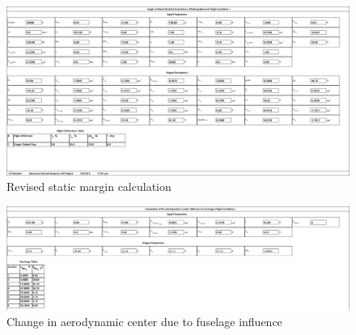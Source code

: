 \documentclass[conf]{new-aiaa}
\begin{document}
\begin{figure}[H]
    \includegraphics[width=\textwidth]{Report3Printouts/Stability/CM_alpha_final.png}
    \caption{Revised static margin calculation}
    \label{fig:cm_alpha_final}
\end{figure}

\begin{figure}[H]
    \includegraphics[width=\textwidth]{Report3Printouts/Stability/delta_x_ac_f_cropped.png}
    \caption{Change in aerodynamic center due to fuselage influence}
    \label{fig:delta_x_ac_f}
\end{figure}
\end{document}
